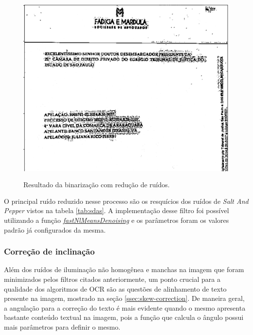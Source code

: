 \begin{figure}[H]
  \centering
  \caption{Resultado da binarização com redução de ruídos.}
  \includegraphics[scale=.7]{figuras/denoising-after-binarization.png}
  \label{fig:denoising-after-binarization}
\end{figure}

O principal ruído reduzido nesse processo são os resquícios dos ruídos de \textit{Salt And Pepper} vistos na tabela \ref{tab:sdas}. A implementação desse filtro foi possível utilizando a função \href{https://docs.opencv.org/master/d1/d79/group__photo__denoise.html#ga76abf348c234cecd0faf3c42ef3dc715}{\textit{fastNlMeansDenoising}} e os parâmetros foram os valores padrão já configurados da mesma.

\subsubsection{Correção de inclinação}

Além dos ruídos de iluminação não homogênea e manchas na imagem que foram minimizados pelos filtros citados anteriormente, um ponto crucial para a qualidade dos algoritmos de OCR são as questões de alinhamento de texto \cite{ocr-survey} presente na imagem, mostrado na seção \ref{ssec:skew-correction}. De maneira geral, a angulação para a correção do texto é mais evidente quando o mesmo apresenta bastante conteúdo textual na imagem, pois a função que calcula o ângulo possui mais parâmetros para definir o mesmo.

